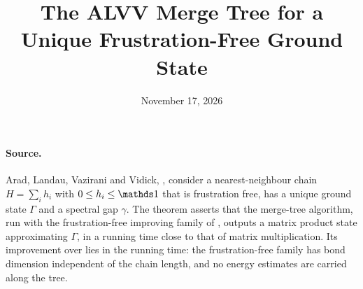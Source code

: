 \documentclass{article}
\title{The ALVV Merge Tree for a Unique Frustration-Free Ground State}
\author{}
\date{November 17, 2026}
\begin{document}
\maketitle
{}

\paragraph{Source.}
Arad, Landau, Vazirani and Vidick,
\cite[Theorem~t:unique, lines 1829--1855]{Arad2016RigorousRG}, consider a
nearest-neighbour chain $H=\sum_ih_i$ with $0\le h_i\le\Id$ that is
frustration free, has a unique ground state $\Gamma$ and a spectral gap
$\gamma$. The theorem asserts that the merge-tree algorithm, run with the
frustration-free improving family of
\cite[Theorem~t:aisff, lines 1580--1609]{Arad2016RigorousRG}, outputs a
matrix product state approximating $\Gamma$, in a running time close to that
of matrix multiplication. Its improvement over
\cite[Theorem~t:alg1, lines 1777--1818]{Arad2016RigorousRG} lies in the
running time: the frustration-free family has bond dimension independent of
the chain length, and no energy estimates are carried along the tree.
\end{document}
